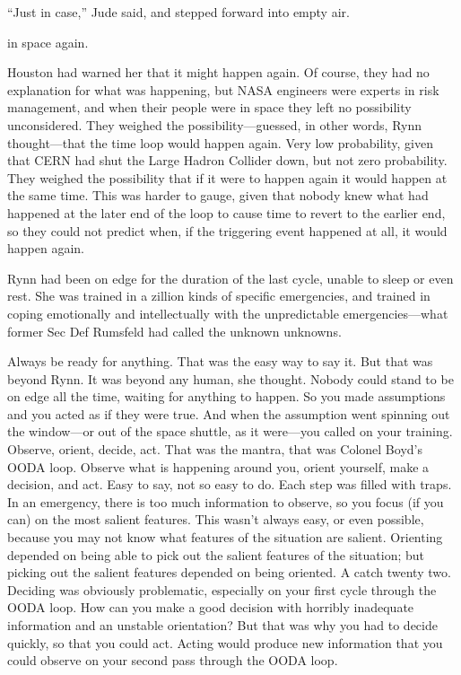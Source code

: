 ``Just in case,'' Jude said, and stepped forward into empty air.




 in space again.

Houston had warned her that it might happen again. Of course, they had no explanation for what was happening, but NASA engineers were experts in risk management, and when their people were in space they left no possibility unconsidered. They weighed the possibility—guessed, in other words, Rynn thought—that the time loop would happen again. Very low probability, given that CERN had shut the Large Hadron Collider down, but not zero probability. They weighed the possibility that if it were to happen again it would happen at the same time. This was harder to gauge, given that nobody knew what had happened at the later end of the loop to cause time to revert to the earlier end, so they could not predict when, if the triggering event happened at all, it would happen again.

Rynn had been on edge for the duration of the last cycle, unable to sleep or even rest. She was trained in a zillion kinds of specific emergencies, and trained in coping emotionally and intellectually with the unpredictable emergencies—what former Sec Def Rumsfeld had called the unknown unknowns.

Always be ready for anything. That was the easy way to say it. But that was beyond Rynn. It was beyond any human, she thought. Nobody could stand to be on edge all the time, waiting for anything to happen. So you made assumptions and you acted as if they were true. And when the assumption went spinning out the window—or out of the space shuttle, as it were—you called on your training. Observe, orient, decide, act. That was the mantra, that was Colonel Boyd's OODA loop. Observe what is happening around you, orient yourself, make a decision, and act. Easy to say, not so easy to do. Each step was filled with traps. In an emergency, there is too much information to observe, so you focus (if you can) on the most salient features. This wasn't always easy, or even possible, because you may not know what features of the situation are salient. Orienting depended on being able to pick out the salient features of the situation; but picking out the salient features depended on being oriented. A catch twenty two. Deciding was obviously problematic, especially on your first cycle through the OODA loop. How can you make a good decision with horribly inadequate information and an unstable orientation? But that was why you had to decide quickly, so that you could act. Acting would produce new information that you could observe on your second pass through the OODA loop.

